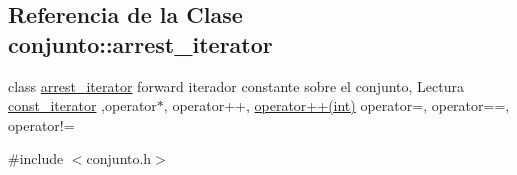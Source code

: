 \hypertarget{classconjunto_1_1arrest__iterator}{\subsection{Referencia de la Clase conjunto\-:\-:arrest\-\_\-iterator}
\label{classconjunto_1_1arrest__iterator}
}


class \hyperlink{classconjunto_1_1arrest__iterator}{arrest\-\_\-iterator} forward iterador constante sobre el conjunto, Lectura \hyperlink{classconjunto_1_1const__iterator}{const\-\_\-iterator} ,operator$\ast$, operator++, \hyperlink{classconjunto_1_1arrest__iterator_a9f350bb37bcac3754df9c13d856ee56c}{operator++(int)} operator=, operator==, operator!=  




{\ttfamily \#include $<$conjunto.\-h$>$}

